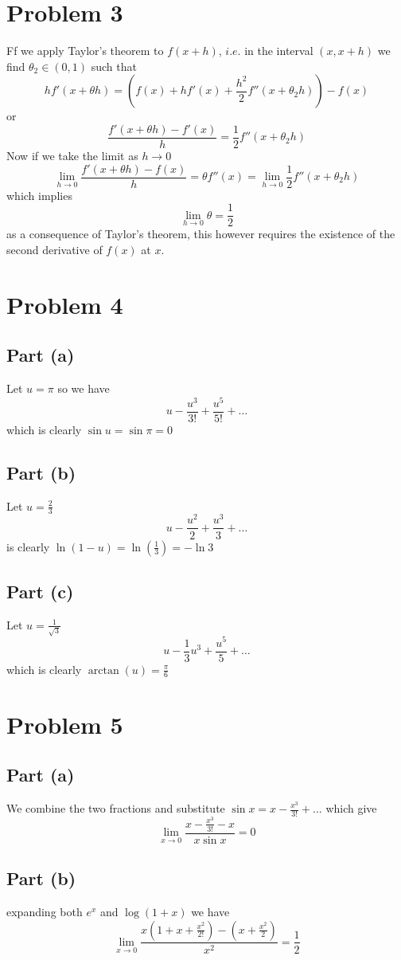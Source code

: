 \documentclass[12pt]{article}
\begin{document}
\section*{Problem 3}
Ff we apply Taylor's theorem to $f(x +h)$, $i$.$e$. in the interval $(x,x+h)$ we find $\theta_{2} \in (0,1)$ such that
$$
hf'(x + \theta h) = \left( f(x) + hf'(x) + \frac{h^{2}}{2}f''(x + \theta_{2}h) \right)-f(x)
$$
or
$$
\frac{f'(x + \theta h)-f'(x)}{h} =\frac{1}{2}f''(x +\theta_{2}h)
$$
Now if we take the limit as $h \to 0$
$$
\lim_{ h \to 0 } \frac{f'(x + \theta h)-f(x)}{h} = \theta f''(x) = \lim_{  h \to 0 } \frac{1}{2}f''(x + \theta_{2}h)
$$
which implies
$$
\lim_{ h \to 0 } \theta = \frac{1}{2}
$$
as a consequence of Taylor's theorem, this however requires the existence of the second derivative of $f(x)$ at $x$.
\section*{Problem 4}
\subsection{Part (a)}
Let $u = \pi$ so we have
$$
u -\frac{u^{3}}{3!} + \frac{u^{5}}{5!} + \dots
$$
which is clearly $\sin u = \sin \pi = 0$

\subsection{Part (b)}
Let $u = \frac{2}{3}$
$$
u - \frac{u^{2}}{2} + \frac{u^{3}}{3} + \dots
$$
is clearly $\ln(1-u) = \ln\left( \frac{1}{3} \right) = -\ln 3$

\subsection{Part (c)}
Let $u=\frac{1}{\sqrt{ 3 }}$
$$
u -\frac{1}{3}u^{3} + \frac{u^{5}}{5} + \dots
$$
which is clearly $\arctan(u) = \frac{\pi}{6}$

\section*{Problem 5}
\subsection{Part (a)}
We combine the two fractions and substitute $\sin x = x -\frac{x^{3}}{3!} + \dots$ which give
$$
\lim_{ x \to 0 } \frac{x-\frac{x^{3}}{3!} -x}{x \sin x} = 0
$$
\subsection{Part (b)}
 expanding both $e^{ x }$ and $\log(1+x)$ we have
$$
\lim_{ x \to 0 } \frac{x\left( 1 + x + \frac{x^{2}}{2!} \right)-\left( x+\frac{x^{2}}{2} \right)}{x^{2}} = \frac{1}{2}
$$
\end{document}
